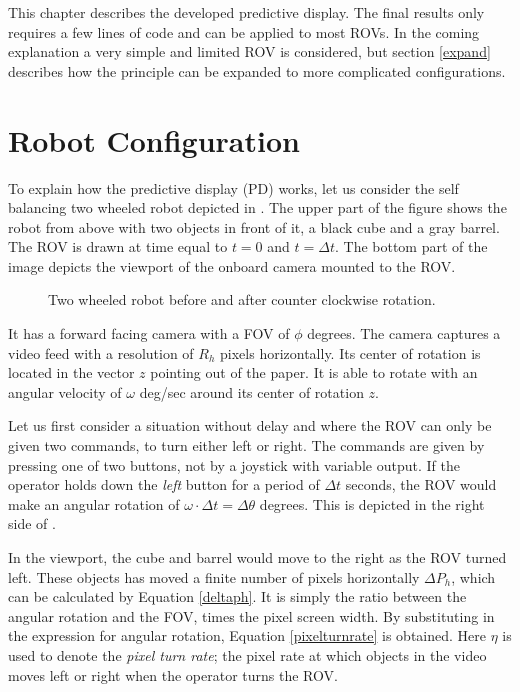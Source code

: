 This chapter describes the developed predictive display. The final results only requires a few lines of code and can be applied to most ROVs. In the coming explanation a very simple and limited ROV is considered, but section \ref{expand} describes how the principle can be expanded to more complicated configurations.

\section{Robot Configuration} \label{chp31}
 
To explain how the predictive display (PD) works, let us consider the self balancing two wheeled robot depicted in . The upper part of the figure shows the robot from above with two objects in front of it, a black cube and a gray barrel. The ROV is drawn at time equal to $t=0$ and $t=\Delta t$. The bottom part of the image depicts the viewport of the onboard camera mounted to the ROV.


\begin{figure}[h!]    
    \centering           
    \def\svgwidth{.75\columnwidth}
    
    \caption{Two wheeled robot before and after counter clockwise rotation.}
    \label{twoWheeled}
\end{figure}


It has a forward facing camera with a FOV of $\phi$ degrees. The camera captures a video feed with a resolution of $R_h$ pixels horizontally. Its center of rotation is located in the vector $z$ pointing out of the paper. It is able to rotate with an angular velocity of $\omega$ deg/sec around its center of rotation $z$.

Let us first consider a situation without delay and where the ROV can only be given two commands, to turn either left or right. The commands are given by pressing one of two buttons, not by a joystick with variable output. If the operator holds down the \emph{left} button for a period of $\Delta t$ seconds, the ROV would make an angular rotation of $\omega \cdot \Delta t = \Delta \theta$ degrees. This is depicted in the right side of .

In the viewport, the cube and barrel would move to the right as the ROV turned left. These objects has moved a finite number of pixels horizontally $\Delta P_h$, which can be calculated by Equation \ref{deltaph}. It is simply the ratio between the angular rotation and the FOV, times the pixel screen width. By substituting in the expression for angular rotation, Equation \ref{pixelturnrate} is obtained. Here $\eta$ is used to denote the \textit{pixel turn rate}; the pixel rate at which objects in the video moves left or right when the operator turns the ROV.

